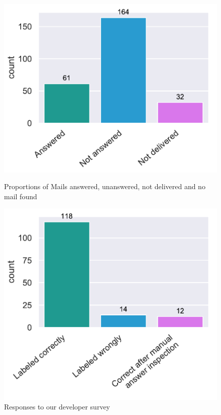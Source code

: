 \documentclass[\myrootdir/main.tex]{subfiles}
\begin{document}
\begin{figure}[htbp]
	\centering
	\begin{minipage}{0.45\textwidth}
		\centering
		\includegraphics[width=\textwidth, clip]{img/dev-mails/answers-received-mails.pdf}
		\caption{Proportions of Mails answered, unanswered, not delivered and no mail found}
		\label{fig:mails-answers-received-mails}
	\end{minipage}\hfill
	\begin{minipage}{0.45\textwidth}
		\centering
		\includegraphics[width=\textwidth, clip]{img/dev-mails/extraction-correct.pdf}
		\caption{Responses to our developer survey}
		\label{fig:mails-extraction-correct}
	\end{minipage}
\end{figure}
\end{document}

